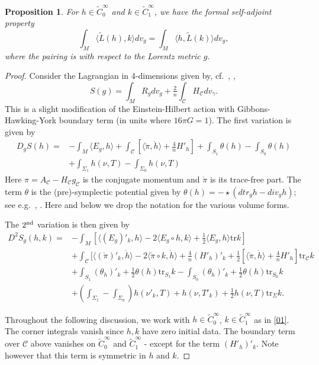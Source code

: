 \documentclass[10pt]{amsart}
\newcommand{\g}{\gamma}
\newcommand{\Si}{\Sigma}
\newcommand{\cC}{{\mathcal C}}
\newcommand{\be}{\begin{equation}}
\newcommand{\ee}{\end{equation}}
\newcommand{\bes}{\begin{equation*}}
\newcommand{\ees}{\end{equation*}}
\newcommand{\tr}{\mathrm{tr}}
\newcommand{\<}{\langle}
\renewcommand{\>}{\rangle}
\newcommand{\w}{\widetilde}
\theoremstyle{plain}
\newtheorem{proposition}[lemma]{Proposition}
\theoremstyle{remark}
\theoremstyle{definition}
\numberwithin{equation}{section}
\begin{document}
\begin{proposition}\label{selfad}
For $h \in \w C^{\infty}_0$ and $k \in \w C^{\infty}_1$, we have the formal self-adjoint property
\be \label{selfadj}
\int_M \<\w L(h), k\> dv_g = \int_M \<h, \w L(k)\> dv_g,
\ee
where the pairing is with respect to the Lorentz metric $g$. 
\end{proposition}

\begin{proof} 

Consider the Lagrangian in 4-dimensions given by, cf.~\cite{A2}, \cite{AA2}, 
\be \label{EH}
S(g) = \int_M R_g dv_g + \tfrac{2}{n}\int_{\cC}H_{\cC} dv_{\g}.
\ee
This is a slight modification of the Einstein-Hilbert action with Gibbons-Hawking-York boundary term (in units where $16\pi G = 1$). The first variation 
is given by 
\bes\begin{split}
D_g S(h) =& -\int_M \<E_g, h\>  + \int_{\cC}[\<\ring{\pi}, \ring{h}\> + \tfrac{4}{n}H'_h] + \int_{S_1}\theta(h) - \int_{S_0}\theta(h)\\
 &{ +\int_{\Si_1}h(\nu,T)-\int_{\Si_0}h(\nu,T)}
 \end{split}\ees
Here $\pi = A_{\cC} - H_{\cC}g_{\cC}$ is the conjugate momentum and $\ring{\pi}$ is its trace-free part. The term $\theta$ is the (pre)-symplectic potential 
given by $\theta(h) = -\star(d tr_g h - div_g h)$; see e.g.~\cite{HW}, \cite{AA2}. Here and below we drop 
the notation for the various volume forms. 

The $2^{\rm nd}$ variation is then given by 
\be \label{2nd}
\begin{split}
 D^2 S_g(h, k) = & -\int_M [\<(E_g)'_k, h\> - 2\<E_g \circ h, k\> + \tfrac{1}{2}\<E_g, h\>\tr k ] \\
 &+ \int_{\cC}[ \<(\ring{\pi})'_k, \ring{h}\> - 2\<\ring{\pi} \circ k, \ring{h}\> + \tfrac{4}{n}(H'_h)'_k + \tfrac{1}{2}[\<\ring{\pi}, \ring{h}\> + \tfrac{4}{n}H'_h]\tr_{\cC}k  \\
&+ \int_{S_1}(\theta_h)'_k + \tfrac{1}{2}\theta(h)\tr_{S_1}k -  \int_{S_0}(\theta_h)'_k + \tfrac{1}{2}\theta(h)\tr_{S_0}k\\
 &{ +(\int_{\Si_1}-\int_{\Si_0})h(\nu'_k,T) + h(\nu, T'_k) + \tfrac{1}{2}h(\nu,T)\tr_\Si k}.
\end{split}
\ee

    Throughout the following discussion, we work with $h \in \w C^{\infty}_0$, $k \in \w C^{\infty}_1$ as in \eqref{01}. The corner integrals vanish 
since $h,k$ have zero initial data. The boundary term over $\cC$ above vanishes on $\w C^{\infty}_0$ and $\w C^{\infty}_1$ - except for the term 
$(H'_h)'_k$. Note however that this term is symmetric in $h$ and $k$.  


\end{proof}
\end{document}
